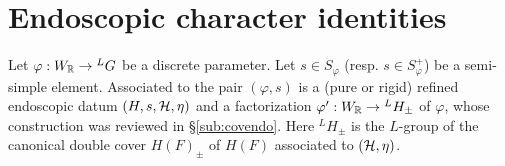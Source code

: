 \documentclass{article}
\theoremstyle{definition}
\numberwithin{equation}{section}
\renewcommand{\-}{\hyp{}}
\newcommand{\warn}[1]{{\leavevmode\color{red}[#1]}}
\begin{document}
\section{Endoscopic character identities} \label{sec:endo}

Let $\varphi : W_{\mathbb{R}} \to {^LG}$ be a discrete parameter. Let $s \in S_\varphi$ (resp. $s \in S_\varphi^+$) be a semi-simple element. Associated to the pair $(\varphi,s)$ is a (pure or rigid) refined endoscopic datum $(H,s,\mathcal{H},\eta)$ and a factorization $\varphi' : W_{\mathbb{R}} \to {^LH_\pm}$ of $\varphi$, whose construction was reviewed in \S\ref{sub:covendo}. Here $^LH_\pm$ is the $L$-group of the canonical double cover $H(F)_\pm$ of $H(F)$ associated to $(\mathcal{H},\eta)$.








\end{document}
